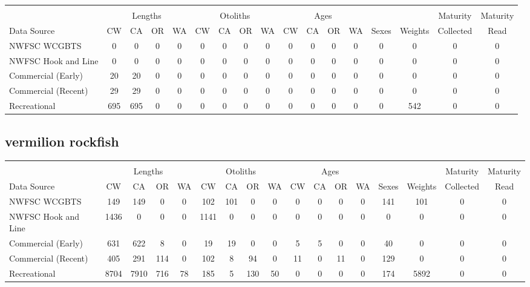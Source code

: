 \documentclass[12pt,]{article}
\begin{document}
\begin{table}[ht]
\centering
\begingroup\fontsize{10pt}{10pt}\selectfont
\begin{tabular}{|l|cccc|cccc|cccc|c|c|c|c|}
  \hline
 &  &  &  &  &  &  &  &  &  &  &  &  &  &  &  &  \\ 
   & \multicolumn{4}{c}{Lengths} &  \multicolumn{4}{c}{Otoliths} & \multicolumn{4}{c}{Ages} &  & & Maturity & Maturity\\
 Data Source & CW & CA & OR & WA & CW & CA & OR & WA & CW & CA & OR & WA & Sexes & Weights & Collected & Read\\
 \hline
NWFSC WCGBTS & 0 & 0 & 0 & 0 & 0 & 0 & 0 & 0 & 0 & 0 & 0 & 0 & 0 & 0 & 0 & 0 \\ 
  NWFSC Hook and Line & 0 & 0 & 0 & 0 & 0 & 0 & 0 & 0 & 0 & 0 & 0 & 0 & 0 & 0 & 0 & 0 \\ 
  Commercial (Early) & 20 & 20 & 0 & 0 & 0 & 0 & 0 & 0 & 0 & 0 & 0 & 0 & 0 & 0 & 0 & 0 \\ 
  Commercial (Recent) & 29 & 29 & 0 & 0 & 0 & 0 & 0 & 0 & 0 & 0 & 0 & 0 & 0 & 0 & 0 & 0 \\ 
  Recreational & 695 & 695 & 0 & 0 & 0 & 0 & 0 & 0 & 0 & 0 & 0 & 0 & 0 & 542 & 0 & 0 \\ 
   \hline
\end{tabular}
\endgroup
\end{table}

\FloatBarrier  

\newpage  

\subsection{vermilion rockfish}\label{vermilion-rockfish}

\begin{table}[ht]
\centering
\begingroup\fontsize{10pt}{10pt}\selectfont
\begin{tabular}{|l|cccc|cccc|cccc|c|c|c|c|}
  \hline
 &  &  &  &  &  &  &  &  &  &  &  &  &  &  &  &  \\ 
   & \multicolumn{4}{c}{Lengths} &  \multicolumn{4}{c}{Otoliths} & \multicolumn{4}{c}{Ages} &  & & Maturity & Maturity\\
 Data Source & CW & CA & OR & WA & CW & CA & OR & WA & CW & CA & OR & WA & Sexes & Weights & Collected & Read\\
 \hline
NWFSC WCGBTS & 149 & 149 & 0 & 0 & 102 & 101 & 0 & 0 & 0 & 0 & 0 & 0 & 141 & 101 & 0 & 0 \\ 
  NWFSC Hook and Line & 1436 & 0 & 0 & 0 & 1141 & 0 & 0 & 0 & 0 & 0 & 0 & 0 & 0 & 0 & 0 & 0 \\ 
  Commercial (Early) & 631 & 622 & 8 & 0 & 19 & 19 & 0 & 0 & 5 & 5 & 0 & 0 & 40 & 0 & 0 & 0 \\ 
  Commercial (Recent) & 405 & 291 & 114 & 0 & 102 & 8 & 94 & 0 & 11 & 0 & 11 & 0 & 129 & 0 & 0 & 0 \\ 
  Recreational & 8704 & 7910 & 716 & 78 & 185 & 5 & 130 & 50 & 0 & 0 & 0 & 0 & 174 & 5892 & 0 & 0 \\ 
   \hline
\end{tabular}
\endgroup
\end{table}
\end{document}
